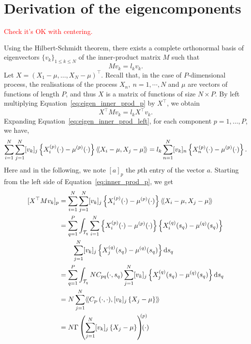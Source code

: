 \section{Derivation of the eigencomponents} %
\label{sec:derivation_of_the_eigencomponents}

\textcolor{red}{Check it's OK with centering.}

Using the Hilbert-Schmidt theorem, there exists a complete orthonormal basis of eigenvectors $\{v_k\}_{1 \leq k \leq N}$ of the inner-product matrix $M$ such that
\begin{equation}\label{eq:eigen_inner_prod_p}
    Mv_k = l_kv_k.
\end{equation}
Let $X = \left(X_1 - \mu, \dots, X_N - \mu\right)^\top$. Recall that, in the case of $P$-dimensional process, the realisations of the process $X_n,~n = 1, \cdots, N$ and $\mu$ are vectors of functions of length $P$, and thus $X$ is a matrix of functions of size $N \times P$. By left multiplying Equation~\eqref{eq:eigen_inner_prod_p} by $X^\top$, we obtain
\begin{equation}\label{eq:eigen_inner_prod_left}
    X^\top M v_k = l_k X^\top v_k.
\end{equation} 
Expanding Equation~\eqref{eq:eigen_inner_prod_left}, for each component $p = 1, \dots, P$, we have,
\begin{equation}\label{eq:inner_prod_p}
    \sum_{i = 1}^N \sum_{j = 1}^N [v_{k}]_j\left\{X_i^{(p)}(\cdot) - \mu^{(p)}(\cdot)\right\}\langle\!\langle X_i - \mu, X_j - \mu\rangle\!\rangle = l_k \sum_{n = 1}^N [v_{k}]_n\left\{X_n^{(p)}(\cdot) - \mu^{(p)}(\cdot)\right\}.
\end{equation}
Here and in the following, we note $[a]_p$ the $p$th entry of the vector $a$. Starting from the left side of Equation~\eqref{eq:inner_prod_p}, we get
\begin{align}\label{eq:inner_prod_p_left}
[X^\top M v_k]_p &= \sum_{i = 1}^N \sum_{j = 1}^N [v_{k}]_j \left\{X_i^{(p)}(\cdot) - \mu^{(p)}(\cdot)\right\}\inH{X_i - \mu}{X_j - \mu}\\
&= \sum_{q = 1}^P \int_{\TT{q}} \sum_{i = 1}^N \left\{X_i^{(p)}(\cdot) - \mu^{(p)}(\cdot)\right\} \left\{X_i^{(q)}(s_q) - \mu^{(q)}(s_q)\right\}  \\
&\quad\quad \sum_{j = 1}^N [v_{k}]_j \left\{X_j^{(q)}(s_q) - \mu^{(q)}(s_q)\right\} \dd s_q \\
&= \sum_{q = 1}^P \int_{\TT{q}} N C_{pq}(\cdot, s_q)\sum_{j = 1}^N [v_{k}]_j \left\{X_j^{(q)}(s_q) - \mu^{(q)}(s_q)\right\} \dd s_q \\
&= N \sum_{j = 1}^N \inH{C_{p \cdot}(\cdot, \cdot)}{[v_{k}]_j \left\{X_j - \mu\right\}} \\
&= N \Gamma\left(\sum_{j = 1}^N [v_{k}]_j \left\{X_j - \mu\right\} \right)^{\mkern-9mu(p)}\mkern-18mu(\cdot)
\end{align}
